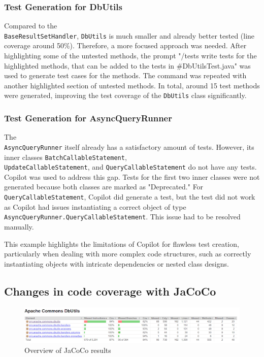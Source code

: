 \documentclass[sigconf]{acmart}
\begin{document}
\subsubsection*{\textbf{Test Generation for DbUtils}}

Compared to the \\ \texttt{BaseResultSetHandler}, \texttt{DbUtils} is much smaller and already better tested (line coverage around 50\%). Therefore, a more focused approach was needed. After highlighting some of the untested methods, the prompt "/tests write tests for the highlighted methods, that can be added to the tests in \#DbUtilsTest.java" was used to generate test cases for the methods. The command was repeated with another highlighted section of untested methods. In total, around 15 test methods were generated, improving the test coverage of the \texttt{DbUtils} class significantly.

\subsubsection*{\textbf{Test Generation for AsyncQueryRunner}}

The \\ \texttt{AsyncQueryRunner} itself already has a satisfactory amount of tests. However, its inner classes \texttt{BatchCallableStatement}, \\ \texttt{UpdateCallableStatement}, and \texttt{QueryCallableStatement} do not have any tests. Copilot was used to address this gap. Tests for the first two inner classes were not generated because both classes are marked as "Deprecated." For \texttt{QueryCallableStatement}, Copilot did generate a test, but the test did not work as Copilot had issues instantiating a correct object of type \\ \texttt{AsyncQueryRunner.QueryCallableStatement}. This issue had to be resolved manually.

This example highlights the limitations of Copilot for flawless test creation, particularly when dealing with more complex code structures, such as correctly instantiating objects with intricate dependencies or nested class designs.

\subsection*{Changes in code coverage with JaCoCo}

\begin{figure}[H]
    \centering
    \includegraphics[width=1\linewidth]{images/jacoco3.png}
    \caption{Overview of JaCoCo results}
\end{figure}
\end{document}
